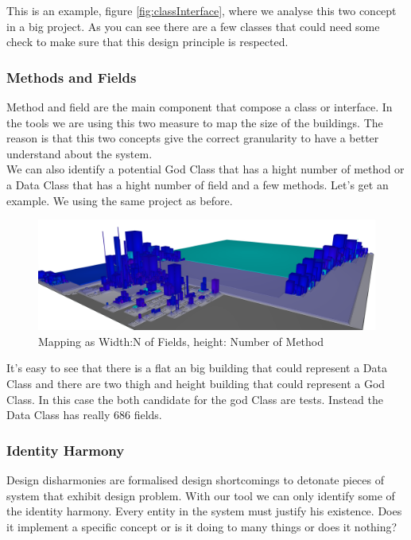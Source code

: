 \documentclass[]{usiinfbachelorproject}
\begin{document}
This is an example, figure \ref{fig:classInterface}, where we analyse this two concept in a big project.
As you can see there are a few classes that could need some check to make sure that this design  principle is respected.

\subsubsection{Methods  and Fields}
Method and field are the main component that compose a class or interface. In the tools we are using this two measure to map  the size of the buildings. The reason is that this two concepts give the correct granularity to have a better understand about the system.\\
We can also identify a potential God Class that has a hight number of method  or a Data Class that has a hight number of field and a few  methods.
Let's get an example. We using the same project as before.
\begin{figure}[h]
	\centering
	\includegraphics[width=1\textwidth]{images/fieldAndMethod}
	\caption[Fields and Methods Mapping]{Mapping as Width:N of Fields, height: Number of Method \label{fig:fieldAndMethods}}




	

\end{figure}

It's easy to see that there is a  flat an big building that could represent a Data Class and  there are two thigh and height building that could represent a God Class. In this case the both candidate for the god Class are tests. Instead the Data Class has really  686 fields.

\subsubsection{Identity Harmony	}\label{sec:idHarmony}
Design disharmonies are formalised design shortcomings to detonate pieces of system that exhibit design problem. With our tool we can only identify some of the identity harmony. Every entity in the system must justify his existence. Does it implement a specific concept or is it doing to many things or does  it nothing?\\
\end{document}
